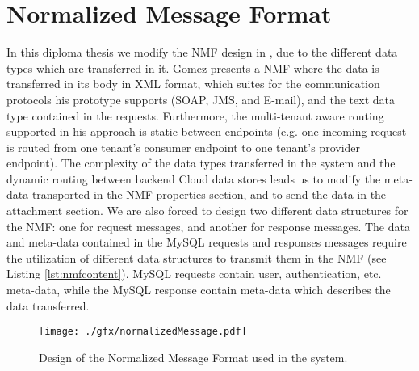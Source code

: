 \section{Normalized Message Format}
\label{sec:normalizedmessage}

In this diploma thesis we modify the \ac{NMF} design in \cite{gomez2012}, due to the different data types which are transferred in it. Gomez presents a \ac{NMF} where the data is transferred in its body in \ac{XML} format, which suites for the communication protocols his prototype supports (SOAP, JMS, and E-mail), and the text data type contained in the requests. Furthermore, the multi-tenant aware routing supported in his approach is static between endpoints (e.g. one incoming request is routed from one tenant's consumer endpoint to one tenant's provider endpoint). The complexity of the data types transferred in the system and the dynamic routing between backend Cloud data stores leads us to modify the meta-data transported in the \ac{NMF} properties section, and to send the data in the attachment section. We are also forced to design two different data structures for the \ac{NMF}: one for request messages, and another for response messages. The data and meta-data contained in the MySQL requests and responses messages require the utilization of different data structures to transmit them in the \ac{NMF} (see Listing \ref{lst:nmfcontent}). MySQL requests contain user, authentication, etc. meta-data, while the MySQL response contain meta-data which describes the data transferred. 

\begin{figure}[htb]
	\centering
		\texttt{[image: ./gfx/normalizedMessage.pdf]}
	\caption[Normalized Message Format Design]{Design of the Normalized Message Format used in the system.}
	\label{fig:nmf}
\end{figure}

